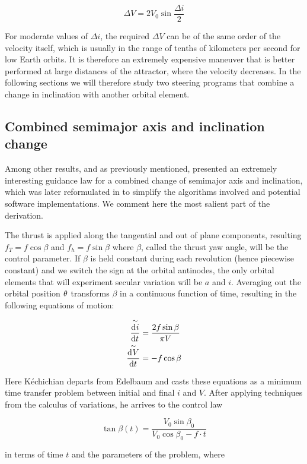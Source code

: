 \[
\Delta V = 2 V_0 \sin \frac{\Delta i}{2}
\]

For moderate values of $\Delta i$, the required $\Delta V$ can be of the same order of the velocity itself, which is usually in the range of tenths of kilometers per second for low Earth orbits. It is therefore an extremely expensive maneuver that is better performed at large distances of the attractor, where the velocity decreases. In the following sections we will therefore study two steering programs that combine a change in inclination with another orbital element.

\subsection{Combined semimajor axis and inclination change} \label{sec:metedelbaum}

Among other results, and as previously mentioned, \cite{edelbaum1961propulsion} presented an extremely interesting guidance law for a combined change of semimajor axis and inclination, which was later reformulated in \cite{kechichian1997reformulation} to simplify the algorithms involved and potential software implementations. We comment here the most salient part of the derivation.

The thrust is applied along the tangential and out of plane components, resulting $f_T = f \cos{\beta}$ and $f_h = f \sin{\beta}$ where $\beta$, called the thrust yaw angle, will be the control parameter. If $\beta$ is held constant during each revolution (hence piecewise constant) and we switch the sign at the orbital antinodes, the only orbital elements that will experiment secular variation will be $a$ and $i$. Averaging out the orbital position $\theta$ transforms $\beta$ in a continuous function of time, resulting in the following equations of motion:

\begin{align*}
\overset{\sim}{\frac{\operatorname{d}\!^{} i}{\operatorname{d}\! t^{}}} & = \frac{2 f \sin{\beta}}{\pi V} \\
\overset{\sim}{\frac{\operatorname{d}\!^{} V}{\operatorname{d}\! t^{}}} & = -f \cos{\beta}
\end{align*}

Here Kéchichian departs from Edelbaum and casts these equations as a minimum time transfer problem between initial and final $i$ and $V$. After applying techniques from the calculus of variations, he arrives to the control law

\[
\tan{\beta(t)} = \frac{V_0 \sin{\beta_0}}{V_0 \cos{\beta_0} - f \cdot t}
\]

in terms of time $t$ and the parameters of the problem, where

